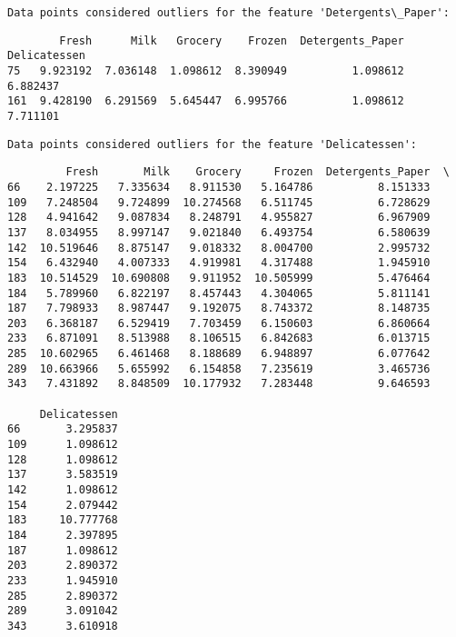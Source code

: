 \documentclass[11pt]{article}
\begin{document}
    
    \begin{Verbatim}[commandchars=\\\{\}]
Data points considered outliers for the feature 'Detergents\_Paper':

    \end{Verbatim}

    
    \begin{verbatim}
        Fresh      Milk   Grocery    Frozen  Detergents_Paper  Delicatessen
75   9.923192  7.036148  1.098612  8.390949          1.098612      6.882437
161  9.428190  6.291569  5.645447  6.995766          1.098612      7.711101
    \end{verbatim}

    
    \begin{Verbatim}[commandchars=\\\{\}]
Data points considered outliers for the feature 'Delicatessen':

    \end{Verbatim}

    
    \begin{verbatim}
         Fresh       Milk    Grocery     Frozen  Detergents_Paper  \
66    2.197225   7.335634   8.911530   5.164786          8.151333   
109   7.248504   9.724899  10.274568   6.511745          6.728629   
128   4.941642   9.087834   8.248791   4.955827          6.967909   
137   8.034955   8.997147   9.021840   6.493754          6.580639   
142  10.519646   8.875147   9.018332   8.004700          2.995732   
154   6.432940   4.007333   4.919981   4.317488          1.945910   
183  10.514529  10.690808   9.911952  10.505999          5.476464   
184   5.789960   6.822197   8.457443   4.304065          5.811141   
187   7.798933   8.987447   9.192075   8.743372          8.148735   
203   6.368187   6.529419   7.703459   6.150603          6.860664   
233   6.871091   8.513988   8.106515   6.842683          6.013715   
285  10.602965   6.461468   8.188689   6.948897          6.077642   
289  10.663966   5.655992   6.154858   7.235619          3.465736   
343   7.431892   8.848509  10.177932   7.283448          9.646593   

     Delicatessen  
66       3.295837  
109      1.098612  
128      1.098612  
137      3.583519  
142      1.098612  
154      2.079442  
183     10.777768  
184      2.397895  
187      1.098612  
203      2.890372  
233      1.945910  
285      2.890372  
289      3.091042  
343      3.610918  
    \end{verbatim}
\end{document}
